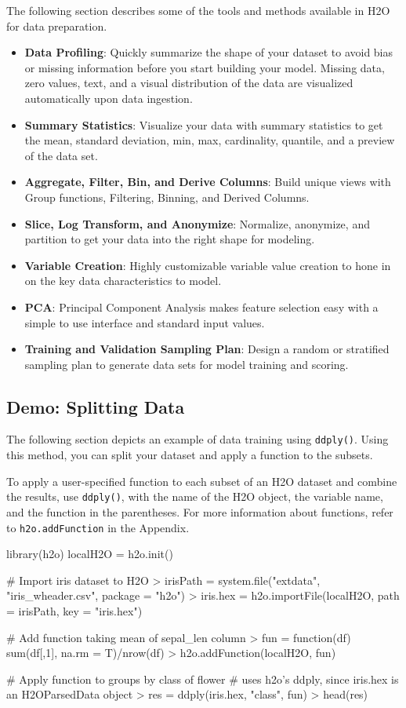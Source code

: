\documentclass[11pt]{article}
\begin{document}
The following section describes some of the tools and methods available in H2O for data preparation. 
\begin{itemize}
\item {\textbf{Data Profiling}}: Quickly summarize the shape of your dataset to avoid bias or missing information before you start building your model. Missing data, zero values, text, and a visual distribution of the data are visualized automatically upon data ingestion. 
\item {\textbf{Summary Statistics}}: Visualize your data with summary statistics to get the mean, standard deviation, min, max, cardinality, quantile, and a preview of the data set. 
\item {\textbf{Aggregate, Filter, Bin, and Derive Columns}}: Build unique views with Group functions, Filtering, Binning, and Derived Columns. 
\item {\textbf{Slice, Log Transform, and Anonymize}}: Normalize, anonymize, and partition to get your data into the right shape for modeling. 
\item {\textbf{Variable Creation}}: Highly customizable variable value creation to hone in on the key data characteristics to model. 
\item {\textbf{PCA}}: Principal Component Analysis makes feature selection easy with a simple to use interface and standard input values. 
\item {\textbf{Training and Validation Sampling Plan}}: Design a random or stratified sampling plan to generate data sets for model training and scoring. 
\end{itemize}

\subsection{Demo: Splitting Data}

The following section depicts an example of data training using {\texttt{ddply()}}. Using this method, you can split your dataset and apply a function to the subsets.

To apply a user-specified function to each subset of an H2O dataset and combine the results, use {\texttt{ddply()}}, with the name of the H2O object, the variable name, and the function in the parentheses. For more information about functions, refer to {\texttt{h2o.addFunction}} in the Appendix.

\begin{spverbatim}
library(h2o)
localH2O = h2o.init()

# Import iris dataset to H2O
> irisPath = system.file("extdata", "iris_wheader.csv", package = "h2o")
> iris.hex = h2o.importFile(localH2O, path = irisPath, key = "iris.hex")

# Add function taking mean of sepal_len column
> fun = function(df) { sum(df[,1], na.rm = T)/nrow(df) }
> h2o.addFunction(localH2O, fun)

# Apply function to groups by class of flower
# uses h2o's ddply, since iris.hex is an H2OParsedData object
> res = ddply(iris.hex, "class", fun)
> head(res)
\end{spverbatim}
\end{document}

